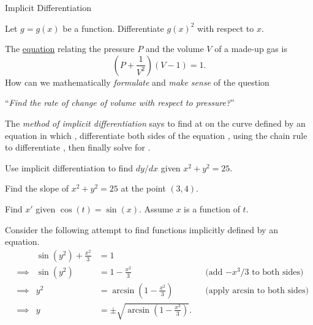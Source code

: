 \documentclass[../main.tex]{subfiles}
\begin{document}
\begin{lesson}{Implicit Differentiation}

  \begin{example}
    Let \(g = g(x)\) be a function. Differentiate \(g(x)^{2}\) with respect to \(x\).
  \end{example}


  The \href{https://www.wolframalpha.com/input?i=implicit+plot+%28P+%2B+1%2FV%5E2%29%28V+-+1%29+%3D+1}{equation} relating the pressure \(P\) and the volume \(V\) of a made-up gas is
    \[
      \left( P + \frac{1}{V^{2}} \right)(V - 1) = 1.
    \]
    How can we mathematically \emph{formulate} and \emph{make sense} of the question 
    \begin{center}
      ``\emph{Find the rate of change of volume with respect to pressure?}''
    \end{center}

    \begin{mdframed}[style=simple]
      The \emph{method of implicit differentiation} says to find  at  on the curve defined by an equation in which , differentiate both sides of the equation , using the chain rule to differentiate , then finally solve for .
    \end{mdframed}

    \begin{example}
      Use implicit differentiation to find \(dy/dx\) given \(x^{2} + y^{2} = 25\). 
    \end{example}


    \begin{example}
      Find the slope of \(x^{2} + y^{2} = 25\) at the point \((3,4)\).
    \end{example}


    \begin{example}
      Find \(x'\) given \(\cos(t) = \sin(x)\). Assume \(x\) is a function of \(t\).
    \end{example}


    \begin{example}
      Consider the following attempt to find functions implicitly defined by an equation.
      \begin{align*}
    && \sin(y^{2}) + \frac{x^{2}}{3} &= 1 \\[3ex]
    &\implies& \sin(y^{2}) &= 1 - \frac{x^{2}}{3} &&\text{(add \(-x^{3}/3\) to both sides)}\\[3ex]
    &\implies& y^{2} &= \arcsin\left( 1 - \frac{x^{2}}{3} \right) &&\text{(apply \(\arcsin\) to both sides)} \\[3ex]
    &\implies& y &= \pm \sqrt{\arcsin\left(1 - \frac{x^{2}}{3}\right)}.
      \end{align*}


\end{example}
\end{lesson}
\end{document}
